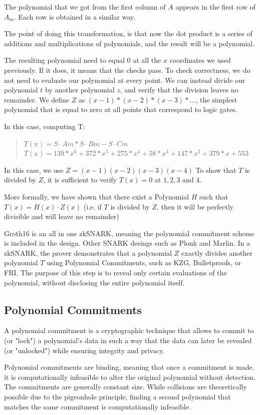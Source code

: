 The polynomial that we got from the first column of $A$ appears in the first row of $A_m$. Each row is obtained in a similar way.

The point of doing this transformation, is that now the dot product is a series of additions and multiplications of polynomials, and the result will be a polynomial.

The resulting polynomial need to equal $0$ at all the $x$ coordinates we used previously.
If it does, it means that the checks pass.
To check correctness, we do not need to evaluate our polynomial at every point. 
We can instead divide our polynomial $t$ by another polynomial $z$, and verify that the division leaves no remainder.
We define $Z$ as $(x - 1) * (x - 2) * (x - 3) * ...$, the simplest polynomial that is equal to zero at all points that correspond to logic gates. 

In this case, computing T:
\begin{quote}
$T(x) = S \cdot Am * S \cdot Bm - S \cdot Cm  $
$T(x) = 139*x^6 + 372*x^5 + 275*x^4 + 58*x^3 + 147*x^2 + 379*x + 553$
\end{quote}

In this case, we use $Z = (x-1)(x-2)(x-3)(x-4)$
To show that $T$ is divided by $Z$, it is sufficient to verify $T(x) = 0$ at $1,2,3$ and $4$.

More formally, we have shown that there exist a Polynomial $H$ such that $T(x)=H(x) \cdot Z(x)$
(i.e. if $T$ is divided by $Z$, then it will be perfectly divisible and will leave no remainder)


Groth16 is an all in one zkSNARK, meaning the polynomial commitment scheme is included in the design. Other SNARK desings such as Plonk and Marlin.
In a zkSNARK, the prover demonstrates that a polynomial $Z$ exactly divides another polynomial
$T$ using Polynomial Commitments, such as KZG, Bulletproofs, or FRI. 
The purpose of this step is to reveal only certain evaluations of the polynomial, without disclosing the entire polynomial itself.\cite{VB16}


\subsection{Polynomial Commitments}
\label{subsec:pc}
A polynomial commitment is a cryptographic technique that allows to commit to (or "lock") a polynomial's data 
in such a way that the data can later be revealed (or "unlocked") while ensuring integrity and privacy.

Polynomial commitments are binding, meaning that once a commitment is made, it is computationally infeasible to alter the original polynomial without detection. 
The commitments are generally constant size. While collisions are theoretically possible due to the pigeonhole principle, finding a second polynomial that matches the same commitment is computationally infeasible.

